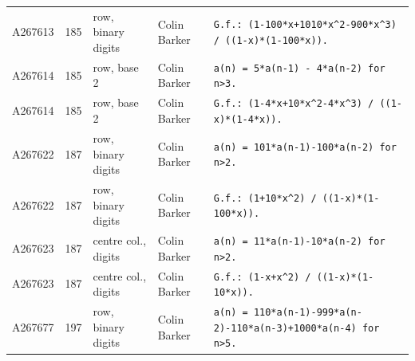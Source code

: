 \documentclass[11pt]{article}
\theoremstyle{definition}
\theoremstyle{remark}
\begin{document}
{\begin{longtable}{p{1.3cm}p{0.7cm}p{2.4cm}p{2.3cm}p{7.3cm}}
A267613 & 185 & row, binary digits & Colin Barker & \texttt{G.f.: \allowbreak{}(1-\allowbreak{}100*\allowbreak{}x+\allowbreak{}1010*\allowbreak{}x\^{}2-\allowbreak{}900*\allowbreak{}x\^{}3)\allowbreak{} \allowbreak{}/\allowbreak{} \allowbreak{}((1-\allowbreak{}x)\allowbreak{}*\allowbreak{}(1-\allowbreak{}100*\allowbreak{}x)\allowbreak{})\allowbreak{}.} \\
A267614 & 185 & row, base 2 & Colin Barker & \texttt{a(n)\allowbreak{} \allowbreak{}=\allowbreak{} \allowbreak{}5*\allowbreak{}a(n-\allowbreak{}1)\allowbreak{} \allowbreak{}-\allowbreak{} \allowbreak{}4*\allowbreak{}a(n-\allowbreak{}2)\allowbreak{} \allowbreak{}for \allowbreak{}n>3.} \\
A267614 & 185 & row, base 2 & Colin Barker & \texttt{G.f.: \allowbreak{}(1-\allowbreak{}4*\allowbreak{}x+\allowbreak{}10*\allowbreak{}x\^{}2-\allowbreak{}4*\allowbreak{}x\^{}3)\allowbreak{} \allowbreak{}/\allowbreak{} \allowbreak{}((1-\allowbreak{}x)\allowbreak{}*\allowbreak{}(1-\allowbreak{}4*\allowbreak{}x)\allowbreak{})\allowbreak{}.} \\
A267622 & 187 & row, binary digits & Colin Barker & \texttt{a(n)\allowbreak{} \allowbreak{}=\allowbreak{} \allowbreak{}101*\allowbreak{}a(n-\allowbreak{}1)\allowbreak{}-\allowbreak{}100*\allowbreak{}a(n-\allowbreak{}2)\allowbreak{} \allowbreak{}for \allowbreak{}n>2.} \\
A267622 & 187 & row, binary digits & Colin Barker & \texttt{G.f.: \allowbreak{}(1+\allowbreak{}10*\allowbreak{}x\^{}2)\allowbreak{} \allowbreak{}/\allowbreak{} \allowbreak{}((1-\allowbreak{}x)\allowbreak{}*\allowbreak{}(1-\allowbreak{}100*\allowbreak{}x)\allowbreak{})\allowbreak{}.} \\
A267623 & 187 & centre col., digits & Colin Barker & \texttt{a(n)\allowbreak{} \allowbreak{}=\allowbreak{} \allowbreak{}11*\allowbreak{}a(n-\allowbreak{}1)\allowbreak{}-\allowbreak{}10*\allowbreak{}a(n-\allowbreak{}2)\allowbreak{} \allowbreak{}for \allowbreak{}n>2.} \\
A267623 & 187 & centre col., digits & Colin Barker & \texttt{G.f.: \allowbreak{}(1-\allowbreak{}x+\allowbreak{}x\^{}2)\allowbreak{} \allowbreak{}/\allowbreak{} \allowbreak{}((1-\allowbreak{}x)\allowbreak{}*\allowbreak{}(1-\allowbreak{}10*\allowbreak{}x)\allowbreak{})\allowbreak{}.} \\
A267677 & 197 & row, binary digits & Colin Barker & \texttt{a(n)\allowbreak{} \allowbreak{}=\allowbreak{} \allowbreak{}110*\allowbreak{}a(n-\allowbreak{}1)\allowbreak{}-\allowbreak{}999*\allowbreak{}a(n-\allowbreak{}2)\allowbreak{}-\allowbreak{}110*\allowbreak{}a(n-\allowbreak{}3)\allowbreak{}+\allowbreak{}1000*\allowbreak{}a(n-\allowbreak{}4)\allowbreak{} \allowbreak{}for \allowbreak{}n>5.} \\

\end{longtable}}
\end{document}
